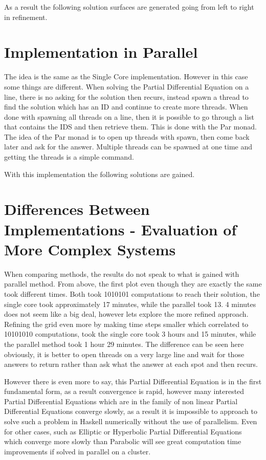 \documentclass{sig-alternate}
\begin{document}
As a result the following solution surfaces are generated going from left to right in refinement. 






\section{Implementation in Parallel }
\label{implementationf}
The idea is the same as the Single Core implementation. However in this case some things are different. When solving the Partial Differential Equation on a line, there is no asking for the solution then recurs, instead spawn a thread to find the solution which has an ID and continue to create more threads. When done with  spawning all threads on a line,  then it is possible to go through a list that contains the IDS and then retrieve them. This is done with the Par monad. The idea of the Par monad is to open up threads with spawn, then come back later and ask for the answer. Multiple threads can be spawned at one time and getting the threads is a simple command. 

With this implementation  the following solutions are gained.


\section{Differences Between Implementations - Evaluation of More Complex Systems}
\label{diff}
When comparing methods, the results do not speak to what is gained with parallel method. From above, the first plot even though they are exactly the same took different times. Both took 1010101 computations to reach their solution, the single core took approximately 17 minutes, while the parallel took 13. 4 minutes does not seem like a big deal, however lets explore the more refined approach. Refining the grid even more by making time steps smaller which correlated to 10101010 computations, took the single core took 3 hours and 15 minutes, while the parallel method took 1 hour 29 minutes. The difference can be seen here obviously, it is better to open threads on a very large line and wait for those answers to return rather than ask what the answer at each spot and then recurs. 

However there is even more to say, this Partial Differential Equation is in the first fundamental form, as a result convergence is rapid, however many interested Partial Differential Equations which are in the family of non linear Partial Differential Equations converge slowly, as a result it is impossible to approach to solve such a problem in Haskell numerically without the use of parallelism. Even for other cases, such as Elliptic or Hyperbolic Partial Differential Equations which converge more slowly than Parabolic will see great computation time improvements if solved in parallel on a cluster. 
\end{document}
